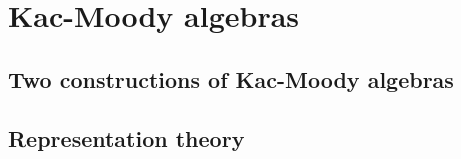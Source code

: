 \section{Kac-Moody algebras}
    \subsection{Two constructions of Kac-Moody algebras}

    \subsection{Representation theory}